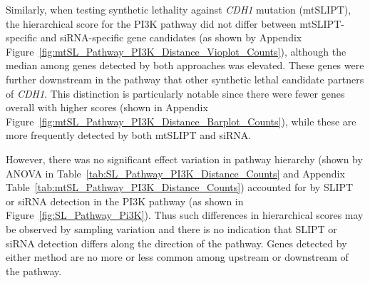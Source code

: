 Similarly, when testing synthetic lethality against \textit{CDH1} mutation (mtSLIPT), the hierarchical score for the \gls{PI3K} pathway did not differ between mtSLIPT-specific and siRNA-specific gene candidates (as shown by Appendix Figure~\ref{fig:mtSL_Pathway_PI3K_Distance_Vioplot_Counts}), although the median among genes detected by both approaches was elevated. These genes were further downstream in the pathway that other synthetic lethal candidate partners of \textit{CDH1}. This distinction is particularly notable since there were fewer genes overall with higher scores (shown in Appendix Figure~\ref{fig:mtSL_Pathway_PI3K_Distance_Barplot_Counts}), while these are more frequently detected by both mtSLIPT and siRNA.

However, there was no significant effect variation in pathway hierarchy (shown by \gls{ANOVA} in Table~\ref{tab:SL_Pathway_PI3K_Distance_Counts} and Appendix Table~\ref{tab:mtSL_Pathway_PI3K_Distance_Counts}) accounted for by SLIPT or siRNA detection in the PI3K pathway (as shown in Figure~\ref{fig:SL_Pathway_Pi3K}). Thus such differences in hierarchical scores may be observed by sampling variation and there is no indication that SLIPT or siRNA detection differs along the direction of the pathway. Genes detected by either method are no more or less common among upstream or downstream of the pathway.




\begin{table*}[!h]
\caption{\gls{ANOVA} for Synthetic Lethality and PI3K Hierarchy}
\label{tab:SL_Pathway_PI3K_Distance_Counts}
\noindent{}
\end{table*}

